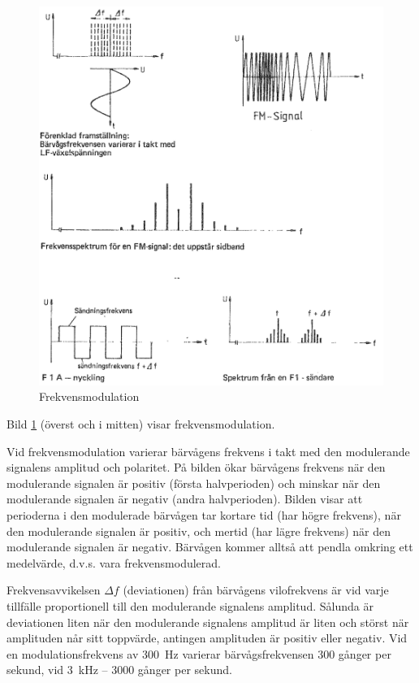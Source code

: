 \begin{figure}
\includegraphics[width=\textwidth]{images/cropped_pdfs/bild_2_1-30.pdf}
\caption{Frekvensmodulation}
\label{fig:BildII1-30}
\end{figure}

Bild \ref{fig:BildII1-30} (överst och i mitten) visar frekvensmodulation.

Vid frekvensmodulation varierar bärvågens frekvens i takt med den modulerande
signalens amplitud och polaritet.
På bilden ökar bärvågens frekvens när den modulerande signalen är positiv
(första halvperioden) och minskar när den modulerande signalen är negativ
(andra halvperioden).
Bilden visar att perioderna i den modulerade bärvågen tar kortare tid (har
högre frekvens), när den modulerande signalen är positiv, och mertid (har lägre
frekvens) när den modulerande signalen är negativ.
Bärvågen kommer alltså att pendla omkring ett medelvärde, d.v.s. vara
frekvensmodulerad.

Frekvensavvikelsen \(\Delta f\) (deviationen) från bärvågens vilofrekvens är
vid varje tillfälle proportionell till den modulerande signalens amplitud.
Sålunda är deviationen liten när den modulerande signalens amplitud är liten
och störst när amplituden når sitt toppvärde, antingen amplituden är positiv
eller negativ.
Vid en modulationsfrekvens av 300~Hz varierar bärvågsfrekvensen 300 gånger per
sekund, vid 3~kHz -- 3000 gånger per sekund.

